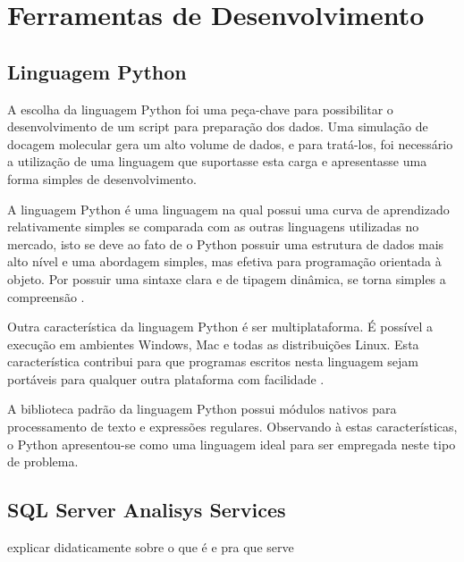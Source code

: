 \chapter{Ferramentas de Desenvolvimento}

\section{Linguagem Python}
A escolha da linguagem Python foi uma peça-chave para possibilitar o desenvolvimento de um script para preparação dos dados. Uma simulação de docagem molecular gera um alto volume de dados, e para tratá-los, foi necessário a utilização de uma linguagem que suportasse esta carga e apresentasse uma forma simples de desenvolvimento.

A linguagem Python é uma linguagem na qual possui uma curva de aprendizado relativamente simples se comparada com as outras linguagens utilizadas no mercado, isto se deve ao fato de o Python possuir uma estrutura de dados mais alto nível e uma abordagem simples, mas efetiva para programação orientada à objeto. Por possuir uma sintaxe clara e de tipagem dinâmica, se torna simples a compreensão \cite{pyt00}. 

Outra característica da linguagem Python é ser multiplataforma. É possível a execução em ambientes Windows, Mac e todas as distribuições Linux. Esta característica contribui para que programas escritos nesta linguagem sejam portáveis para qualquer outra plataforma com facilidade \cite{pyt01}.

A biblioteca padrão da linguagem Python possui módulos nativos para processamento de texto e expressões regulares. Observando à estas características, o Python apresentou-se como uma linguagem ideal para ser empregada neste tipo de problema. 

\section{SQL Server Analisys Services}
	explicar didaticamente sobre o que é e pra que serve